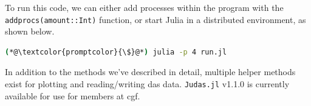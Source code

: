 

To run this code, we can either add processes within the program with the \texttt{addprocs(amount::Int)} function, or start Julia in a distributed environment, as shown below.

\begin{lstlisting}[style=shellcommand, language=bash, label={code:judasrun}]
(*@\textcolor{promptcolor}{\$}@*) julia -p 4 run.jl
\end{lstlisting}

In addition to the methods we've described in detail, multiple helper methods exist for plotting and reading/writing \acrshort{das} data. \texttt{Judas.jl} v1.1.0 is currently available for use for members at \acrshort{cgf}. 

